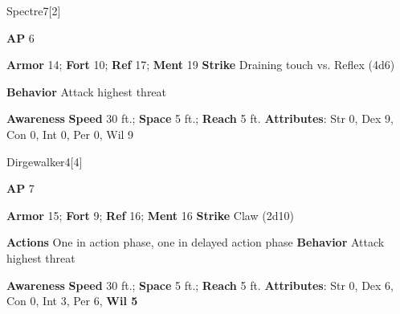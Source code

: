 \begin{monsection}{Spectre}{7}[2]
\vspace{-1em}\vspace{-1em}
\begin{spellcontent}
\begin{spelltargetinginfo}
{\textbf{AP} 6}

\pari \textbf{Armor} 14;
\textbf{Fort} 10;
\textbf{Ref} 17;
\textbf{Ment} 19
\pari \textbf{Strike} Draining touch  vs. Reflex (4d6)



\pari \textbf{Behavior} Attack highest threat
\end{spelltargetinginfo}
\end{spellcontent}

\begin{monsterfooter}
\pari \textbf{Awareness} 
\pari \textbf{Speed} 30 ft.;
\textbf{Space} 5 ft.;
\textbf{Reach} 5 ft.
\pari \textbf{Attributes}:
Str 0,
Dex 9,
Con 0,
Int 0,
Per 0,
Wil 9
\end{monsterfooter}
\end{monsection}

\begin{monsection}{Dirgewalker}{4}[4]
\vspace{-1em}\vspace{-1em}
\begin{spellcontent}
\begin{spelltargetinginfo}
{\textbf{AP} 7}

\pari \textbf{Armor} 15;
\textbf{Fort} 9;
\textbf{Ref} 16;
\textbf{Ment} 16
\pari \textbf{Strike} Claw  (2d10)


\pari \textbf{Actions} One in action phase, one in delayed action phase
\pari \textbf{Behavior} Attack highest threat
\end{spelltargetinginfo}
\end{spellcontent}

\begin{monsterfooter}
\pari \textbf{Awareness} 
\pari \textbf{Speed} 30 ft.;
\textbf{Space} 5 ft.;
\textbf{Reach} 5 ft.
\pari \textbf{Attributes}:
Str 0,
Dex 6,
Con 0,
Int 3,
Per 6,
\textbf{Wil 5}
\end{monsterfooter}
\end{monsection}


